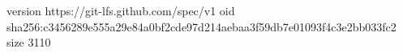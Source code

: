 version https://git-lfs.github.com/spec/v1
oid sha256:c3456289e555a29e84a0bf2cde97d214aebaa3f59db7e01093f4c3e2bb033fc2
size 3110
